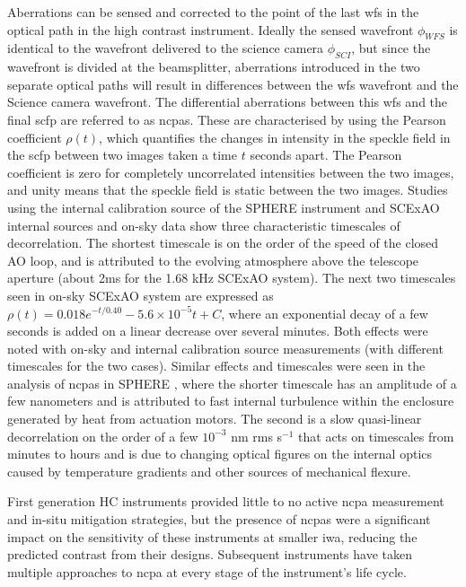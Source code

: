 \documentclass[letterpaper]{ar-1col}
\begin{document}
Aberrations can be sensed and corrected to the point of the last \ac{wfs} in the optical path in the high contrast instrument.
%
Ideally the sensed wavefront $\phi_{WFS}$ is identical to the wavefront delivered to the science camera $\phi_{SCI}$, but since the wavefront is divided at the beamsplitter, aberrations introduced in the two separate optical paths will result in differences between the \ac{wfs} wavefront and the Science camera wavefront.
%
The differential aberrations between this \ac{wfs} and the final \ac{scfp} are referred to as \acp{ncpa}.
%
These are characterised by using the Pearson coefficient $\rho(t)$, which quantifies the changes in intensity in the speckle field in the \ac{scfp} between two images taken a time $t$ seconds apart.
%
The Pearson coefficient is zero for completely uncorrelated intensities between the two images, and unity means that the speckle field is static between the two images.
%
Studies using the internal calibration source of the SPHERE instrument \citep{Martinez12,Milli18,Vigan22} and SCExAO internal sources and on-sky data \citep{Goebel18} show three characteristic timescales of decorrelation.
%
The shortest timescale is on the order of the speed of the closed AO loop, and is attributed to the evolving atmosphere above the telescope aperture (about 2ms for the 1.68 kHz SCExAO system).
%
The next two timescales seen in on-sky SCExAO system are expressed as $\rho(t)=0.018 e^{-t/0.40}-5.6\times 10^{-5}t + C$, where an exponential decay of a few seconds is added on a linear decrease over several minutes.
%
Both effects were noted with on-sky and internal calibration source measurements (with different timescales for the two cases).
%
Similar effects and timescales were seen in the analysis of \acp{ncpa} in SPHERE \citep{Vigan22}, where the shorter timescale has an amplitude of a few nanometers and is attributed to fast internal turbulence within the enclosure generated by heat from actuation motors.
%
The second is a slow quasi-linear decorrelation on the order of a few $10^{-3}$ nm rms s$^{-1}$ that acts on timescales from minutes to hours and is due to changing optical figures on the internal optics caused by temperature gradients and other sources of mechanical flexure.

First generation HC instruments provided little to no active \ac{ncpa} measurement and in-situ mitigation strategies, but the presence of \acp{ncpa} were a significant impact on the sensitivity of these instruments at smaller \ac{iwa}, reducing the predicted contrast from their designs.
%
Subsequent instruments have taken multiple approaches to \ac{ncpa} at every stage of the instrument's life cycle.
\end{document}
